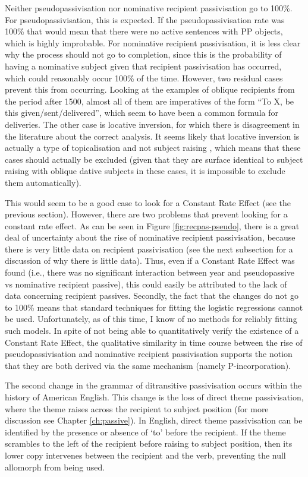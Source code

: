 	Neither pseudopassivisation nor nominative recipient passivisation go to 100\%. For pseudopassivisation, this is expected. If the pseudopassivisation rate was 100\% that would mean that there were no active sentences with PP objects, which is highly improbable. For nominative recipient passivisation, it is less clear why the process should not go to completion, since this is the probability of having a nominative subject given that recipient passivisation has occurred, which could reasonably occur 100\% of the time. However, two residual cases prevent this from occurring. Looking at the examples of oblique recipients from the period after 1500, almost all of them are imperatives of the form ``To X, be this given/sent/delivered'', which seem to have been a common formula for deliveries. The other case is locative inversion, for which there is disagreement in the literature about the correct analysis. It seems likely that locative inversion is actually a type of topicalisation and not subject raising \citep{Bresnan.1994}, which means that these cases should actually be excluded (given that they are surface identical to subject raising with oblique dative subjects in these cases, it is impossible to exclude them automatically).

	This would seem to be a good case to look for a Constant Rate Effect (see the previous section). However, there are two problems that prevent looking for a constant rate effect. As can be seen in Figure \ref{fig:recpas-pseudo}, there is a great deal of uncertainty about the rise of nominative recipient passivisation, because there is very little data on recipient passivisation (see the next subsection for a discussion of why there is little data). Thus, even if a Constant Rate Effect was found (i.e., there was no significant interaction between year and pseudopassive vs nominative recipient passive), this could easily be attributed to the lack of data concerning recipient passives. Secondly, the fact that the changes do not go to 100\% means that standard techniques for fitting the logistic regressions cannot be used. Unfortunately, as of this time, I know of no methods for reliably fitting such models. In spite of not being able to quantitatively verify the existence of a Constant Rate Effect, the qualitative similarity in time course between the rise of pseudopassivisation and nominative recipient passivisation supports the notion that they are both derived via the same mechanism (namely P-incorporation).

	The second change in the grammar of ditransitive passivisation occurs within the history of American English. This change is the loss of direct theme passivisation, where the theme raises across the recipient to subject position (for more discussion see Chapter \ref{ch:passive}). In English, direct theme passivisation can be identified by the presence or absence of `to' before the recipient. If the theme scrambles to the left of the recipient before raising to subject position, then its lower copy intervenes between the recipient and the verb, preventing the null allomorph from being used. 


